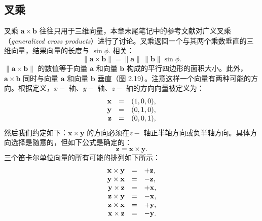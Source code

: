 \subsection{叉乘}


叉乘 $\mathbf{a}\times\mathbf{b}$ 往往只用于三维向量，本章末尾笔记中的参考文献对广义叉乘（\textit{generalized cross products}）进行了讨论。叉乘返回一个与其两个乘数垂直的三维向量，结果向量的长度与 $\sin\phi.$ 相关：
\[
  \|\mathbf{a}\times\mathbf{b}\|=\|\mathbf{a}\|\,\|\mathbf{b}\|\sin\phi.
\]
$\|\mathbf{a}\times\mathbf{b}\|$ 的数值等于向量 $\mathbf{a}$ 和向量 $\mathbf{b}$ 构成的平行四边形的面积大小。此外，$\mathbf{a}\times\mathbf{b}$ 同时与向量 $\mathbf{a}$ 和向量 $\mathbf{b}$ 垂直（图 2.19）。注意这样一个向量有两种可能的方向。根据定义，$x-$ 轴、$y-$ 轴、$z-$ 轴的方向向量被定义为：
\[
  \begin{array}{r c l}{\mathbf{x}}&{=}&{(1,0,0),}\\ {\mathbf{y}}&{=}&{(0,1,0),}\\ {\mathbf{z}}&{=}&{(0,0,1),}\end{array}
\]
然后我们约定如下：$\mathbf{x}\times\mathbf{y}$ 的方向必须在$z-$ 轴正半轴方向或负半轴方向。具体方向选择是随意的，但如下公式是确定的：
\[
  \mathbf{z}=\mathbf{x}\times\mathbf{y}.
\]
三个笛卡尔单位向量的所有可能的排列如下所示：
\[
  \begin{array}{r c l}{{\mathbf{x}\times\mathbf{y}}}&{{=}}&{{+\mathbf{z},}}\\ {{\mathbf{y}\times\mathbf{x}}}&{{=}}&{{-\mathbf{z},}}\\ {{\mathbf{y}\times\mathbf{z}}}&{{=}}&{{+\mathbf{x},}}\\ {{\mathbf{z}\times\mathbf{y}}}&{{=}}&{{-\mathbf{x},}}\\ {{\mathbf{z}\times\mathbf{x}}}&{{=}}&{{+\mathbf{y},}}\\ {{\mathbf{x}\times\mathbf{z}}}&{{=}}&{{-\mathbf{y}.}}\end{array}
\]

